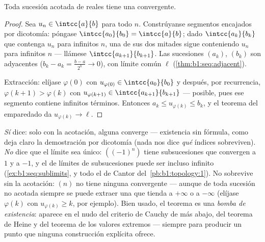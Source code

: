 \begin{theorem}\label{thm:b1:seq:bw}
Toda sucesión acotada de reales tiene una 
convergente.
\end{theorem}

\begin{proof}
Sea $u_n \in \intcc{a}{b}$ para todo $n$. Constrúyanse segmentos
encajados por dicotomía: póngase $\intcc{a_0}{b_0} = \intcc{a}{b}$;
dado $\intcc{a_k}{b_k}$ que contenga $u_n$ para infinitos $n$, una de
sus dos mitades sigue conteniendo $u_n$ para infinitos $n$ ---
llámese $\intcc{a_{k+1}}{b_{k+1}}$. Las sucesiones $(a_k)$, $(b_k)$
son adyacentes ($b_k - a_k = \frac{b-a}{2^k} \to 0$), con límite común
$\ell$ (\cref{thm:b1:seq:adjacent}).

Extracción: elíjase $\varphi(0)$ con
$u_{\varphi(0)} \in \intcc{a_0}{b_0}$ y después, por recurrencia,
$\varphi(k+1) > \varphi(k)$ con $u_{\varphi(k+1)} \in
\intcc{a_{k+1}}{b_{k+1}}$ --- posible, pues ese segmento contiene
infinitos términos. Entonces $a_k \leq u_{\varphi(k)} \leq b_k$, y el
teorema del emparedado da $u_{\varphi(k)} \to \ell$.
\end{proof}

\begin{remark}
\emph{Sí} dice: solo con la acotación, alguna  converge ---
existencia sin fórmula, como deja claro la demostración por dicotomía
(nada nos dice \emph{qué} índices sobreviven). \emph{No} dice que el
límite sea único: $((-1)^n)$ tiene subsucesiones que convergen a $1$
y a $-1$, y el  de límites de subsucesiones puede ser incluso
infinito (\cref{ex:b1:seq:sublimits}, y todo el  de Cantor
del~\cref{pb:b1:topology:1}). No sobrevive sin la acotación: $(n)$ no
tiene ninguna  convergente --- aunque de toda sucesión no
acotada siempre se puede extraer una  que tienda a
$+\infty$ o a $-\infty$ (elíjase $\varphi(k)$ con
$u_{\varphi(k)} \geq k$, por ejemplo). Bien usado, el teorema es una
\emph{bomba de existencia}: aparece en el nudo del criterio de Cauchy
de más abajo, del teorema de Heine y del teorema de los valores
extremos --- siempre para producir un punto que ninguna construcción
explícita ofrece.
\end{remark}

